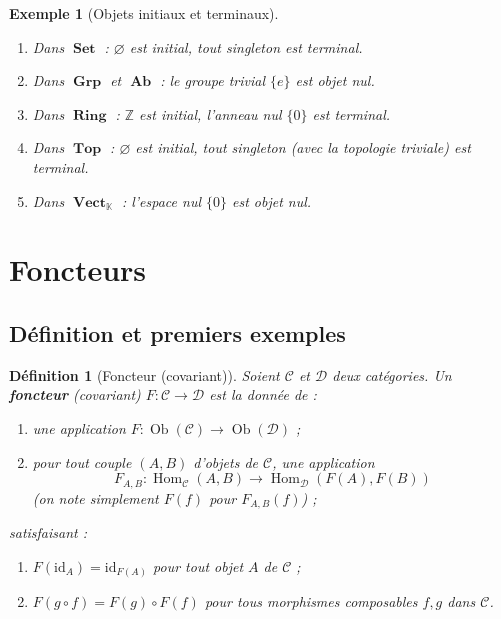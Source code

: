 \documentclass[a4paper,12pt]{book}
\DeclareMathOperator{\Hom}{Hom}
\DeclareMathOperator{\Ob}{Ob}
\DeclareMathOperator{\Set}{\mathbf{Set}}
\DeclareMathOperator{\Grp}{\mathbf{Grp}}
\DeclareMathOperator{\Ab}{\mathbf{Ab}}
\DeclareMathOperator{\Ring}{\mathbf{Ring}}
\DeclareMathOperator{\Top}{\mathbf{Top}}
\DeclareMathOperator{\Vect}{\mathbf{Vect}}
\newcommand{\id}{\mathrm{id}}
\newcommand{\Z}{\mathbb{Z}}
\newcommand{\K}{\mathbb{K}}
\newtheorem{definition}[theoreme]{Définition}
\newtheorem{exemple}[theoreme]{Exemple}
\begin{document}
\begin{exemple}[Objets initiaux et terminaux]\label{ex:init-term}
\begin{enumerate}[label=(\alph*)]
  \item Dans $\Set$ : $\varnothing$ est initial, tout singleton est terminal.
  \item Dans $\Grp$ et $\Ab$ : le groupe trivial $\{e\}$ est objet nul.
  \item Dans $\Ring$ : $\Z$ est initial, l'anneau nul $\{0\}$ est terminal.
  \item Dans $\Top$ : $\varnothing$ est initial, tout singleton (avec la topologie triviale) est terminal.
  \item Dans $\Vect_\K$ : l'espace nul $\{0\}$ est objet nul.
\end{enumerate}
\end{exemple}

\section{Foncteurs}

\subsection{Définition et premiers exemples}

\begin{definition}[Foncteur (covariant)]\label{def:foncteur}
Soient $\mathcal{C}$ et $\mathcal{D}$ deux catégories. Un \textbf{foncteur} (covariant) $F : \mathcal{C} \to \mathcal{D}$ est la donnée de :
\begin{enumerate}[label=(\roman*)]
  \item une application $F : \Ob(\mathcal{C}) \to \Ob(\mathcal{D})$ ;
  \item pour tout couple $(A, B)$ d'objets de $\mathcal{C}$, une application
  \[
    F_{A,B} : \Hom_{\mathcal{C}}(A, B) \longrightarrow \Hom_{\mathcal{D}}(F(A), F(B))
  \]
  (on note simplement $F(f)$ pour $F_{A,B}(f)$) ;
\end{enumerate}
satisfaisant :
\begin{enumerate}[label=(F\arabic*)]
  \item $F(\id_A) = \id_{F(A)}$ pour tout objet $A$ de $\mathcal{C}$ ;
  \item $F(g \circ f) = F(g) \circ F(f)$ pour tous morphismes composables $f, g$ dans $\mathcal{C}$.
\end{enumerate}
\end{definition}
\end{document}
